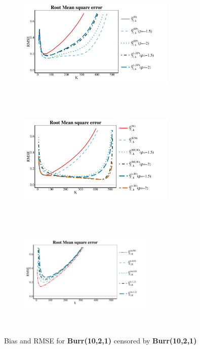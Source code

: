 \begin{landscape}
\begin{figure}[h]
\begin{subfigure}[h]{0.3\linewidth}
		\includegraphics[width=7.5cm,height=5.5cm]{./plots/paper2/RMSE_simulations_B11_H.pdf}
	\end{subfigure}
	\hspace{\fill}
	\begin{subfigure}[h]{0.3\linewidth}
		\includegraphics[width=7.5cm,height=5.5cm]{./plots/paper2/RMSE_simulations_B11_W.pdf}
	\end{subfigure}
	\hspace{\fill}
	\begin{subfigure}[h]{0.3\linewidth}
		\includegraphics[width=6.5cm,height=5.5cm]{./plots/paper2/RMSE_simulations_B11_B.pdf}
	\end{subfigure}
	\caption{Bias and RMSE for \textbf{Burr(10,2,1)} censored by \textbf{Burr(10,2,1)}}
\label{paper2:fig2}
\end{figure}



\end{landscape}
